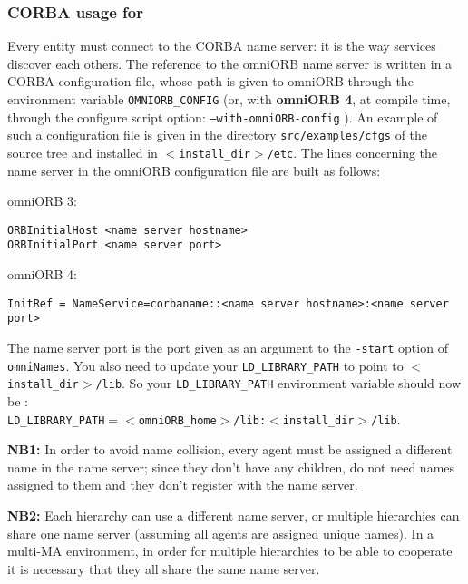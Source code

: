 \subsubsection{CORBA usage for \diet}

Every \diet entity must connect to the CORBA name server: it is the way
services discover each others. The reference to the omniORB name server is
written in a CORBA configuration file, whose path is given to omniORB through
the environment variable \texttt{OMNIORB\_CONFIG} (or, with \textbf{omniORB 4},
at compile time, through the configure script option:
\texttt{--with-omniORB-config} ). An example of such a configuration file is
given in the directory \texttt{src/examples/cfgs} of the \diet source tree and
installed in \texttt{$<$install\_dir$>$/etc}. The lines concerning the name
server in the omniORB configuration file are built as follows:
\begin{description}
 \item{omniORB 3:}
{\footnotesize
\begin{verbatim}
ORBInitialHost <name server hostname>
ORBInitialPort <name server port>
\end{verbatim}
}
 \item{omniORB 4:}
{\footnotesize
\begin{verbatim}
InitRef = NameService=corbaname::<name server hostname>:<name server
port>
\end{verbatim}
} 
\end{description}
The name server port is the port given as an argument to the \texttt{-start}
option of \texttt{omniNames}. You also need to update your
\texttt{LD\_LIBRARY\_PATH} to point to \texttt{$<$install\_dir$>$/lib}.  So
your \texttt{LD\_LIBRARY\_PATH} environment variable should now be
:\\ \texttt{LD\_LIBRARY\_PATH$= <$omniORB\_home$>$/lib:$<$install\_dir$>$/lib}.

\textbf{NB1:} In order to avoid name collision, every agent must be  assigned a
different name in the name server; since they don't have any children, \seds do
not need names assigned to them and they don't register with the name server.

\textbf{NB2:} Each \diet hierarchy can use a different name server, or multiple
hierarchies can share one name server (assuming all agents are assigned  unique
names). In a multi-MA environment, in order for multiple hierarchies to be able
to cooperate it is necessary that they all share the same name server.

